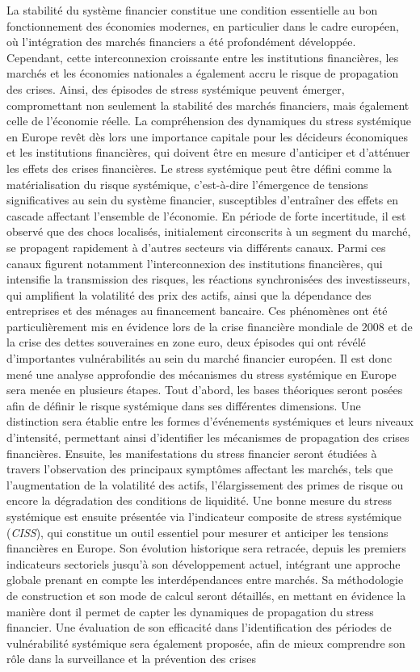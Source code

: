 La stabilité du système financier constitue une condition essentielle au bon fonctionnement des économies modernes, en particulier dans le cadre européen, où l’intégration des marchés financiers a été profondément développée. Cependant, cette interconnexion croissante entre les institutions financières, les marchés et les économies nationales a également accru le risque de propagation des crises. Ainsi, des épisodes de stress systémique peuvent émerger, compromettant non seulement la stabilité des marchés financiers, mais également celle de l’économie réelle. La compréhension des dynamiques du stress systémique en Europe revêt dès lors une importance capitale pour les décideurs économiques et les institutions financières, qui doivent être en mesure d’anticiper et d’atténuer les effets des crises financières. Le stress systémique peut être défini comme la matérialisation du risque systémique, c'est-à-dire l’émergence de tensions significatives au sein du système financier, susceptibles d’entraîner des effets en cascade affectant l’ensemble de l’économie. En période de forte incertitude, il est observé que des chocs localisés, initialement circonscrits à un segment du marché, se propagent rapidement à d’autres secteurs via différents canaux. Parmi ces canaux figurent notamment l’interconnexion des institutions financières, qui intensifie la transmission des risques, les réactions synchronisées des investisseurs, qui amplifient la volatilité des prix des actifs, ainsi que la dépendance des entreprises et des ménages au financement bancaire. Ces phénomènes ont été particulièrement mis en évidence lors de la crise financière mondiale de 2008 et de la crise des dettes souveraines en zone euro, deux épisodes qui ont révélé d’importantes vulnérabilités au sein du marché financier européen. Il est donc mené une analyse approfondie des mécanismes du stress systémique en Europe sera menée en plusieurs étapes. Tout d’abord, les bases théoriques seront posées afin de définir le risque systémique dans ses différentes dimensions. Une distinction sera établie entre les formes d’événements systémiques et leurs niveaux d’intensité, permettant ainsi d’identifier les mécanismes de propagation des crises financières. Ensuite, les manifestations du stress financier seront étudiées à travers l’observation des principaux symptômes affectant les marchés, tels que l’augmentation de la volatilité des actifs, l’élargissement des primes de risque ou encore la dégradation des conditions de liquidité. Une bonne mesure du stress systémique est ensuite présentée via l’indicateur composite de stress systémique (\textit{CISS}), qui constitue un outil essentiel pour mesurer et anticiper les tensions financières en Europe. Son évolution historique sera retracée, depuis les premiers indicateurs sectoriels jusqu’à son développement actuel, intégrant une approche globale prenant en compte les interdépendances entre marchés. Sa méthodologie de construction et son mode de calcul seront détaillés, en mettant en évidence la manière dont il permet de capter les dynamiques de propagation du stress financier. Une évaluation de son efficacité dans l’identification des périodes de vulnérabilité systémique sera également proposée, afin de mieux comprendre son rôle dans la surveillance et la prévention des crises 